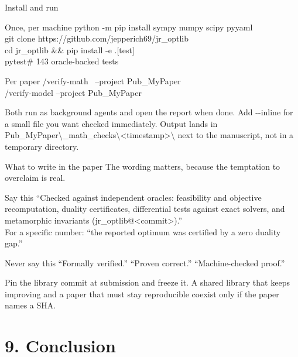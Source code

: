 \documentclass[aspectratio=169,11pt]{beamer}
\newcommand{\code}[1]{{\ttfamily\small #1}}
\begin{document}
\begin{frame}{Install and run}
  \begin{block}{Once, per machine}
  {\ttfamily\small
  python -m pip install sympy numpy scipy pyyaml\\[0.3em]
  git clone https://github.com/jepperich69/jr\_optlib\\[0.3em]
  cd jr\_optlib \&\& pip install -e .[test]\\[0.3em]
  pytest\hfill{\color{slate}\# 143 oracle-backed tests}}
  \end{block}
  \begin{block}{Per paper}
  {\ttfamily\small
  /verify-math \ --project Pub\_MyPaper\\[0.3em]
  /verify-model --project Pub\_MyPaper}
  \end{block}
  \vfill
  Both run as background agents and open the report when done. Add \code{-{}-inline} for a small
  file you want checked immediately.
  \vfill
  {\color{slate} Output lands in \code{Pub\_MyPaper{\textbackslash}\_math\_checks{\textbackslash}<timestamp>{\textbackslash}}
  next to the manuscript, not in a temporary directory.}
\end{frame}

\begin{frame}{What to write in the paper}
  The wording matters, because the temptation to overclaim is real.
  \vfill
  \begin{block}{Say this}
    ``Checked against independent oracles: feasibility and objective recomputation, duality
    certificates, differential tests against exact solvers, and metamorphic invariants
    (\code{jr\_optlib@<commit>}).''\\[0.5em]
    For a specific number: ``the reported optimum was certified by a zero duality gap.''
  \end{block}
  \begin{block}{Never say this}
    ``Formally verified.'' ``Proven correct.'' ``Machine-checked proof.''
  \end{block}
  \vfill
  Pin the library commit at submission and freeze it. A shared library that keeps improving and a
  paper that must stay reproducible coexist only if the paper names a SHA.
\end{frame}

\section{9. Conclusion}
\begin{frame}[plain]
  \vfill{}\vfill
\end{frame}
\end{document}
